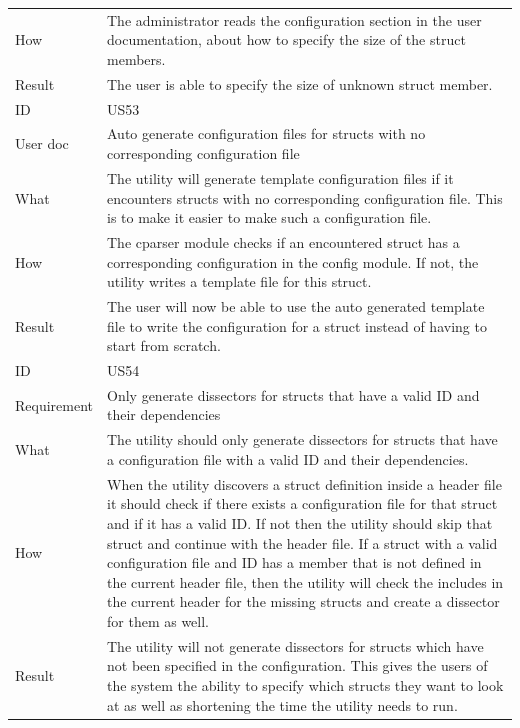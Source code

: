 \begin{table}[htbp]
{\begin{tabularx}{1.2\textwidth}{l X}
	How & The administrator reads the configuration section in the user documentation, about how to specify the size of the \gls{struct} \glspl{member}. \\
	Result & The user is able to specify the size of unknown \gls{struct} \gls{member}. \\	
	\midrule
	ID & US53 \\
	User doc & Auto generate configuration files for \glspl{struct} with no corresponding configuration file \\
	What & The \gls{utility} will generate template configuration files if it encounters \glspl{struct} with no corresponding configuration file. This is to make it easier to make such a configuration file.   \\
	How & The cparser module checks if an encountered \gls{struct} has a corresponding configuration in the config module. If not, the \gls{utility} writes a template file for this \gls{struct}.   \\
	Result & The user will now be able to use the auto generated template file to write the configuration for a \gls{struct} instead of having to start from scratch. \\
	\midrule
	ID & US54 \\
	Requirement & Only generate \glspl{dissector} for \glspl{struct} that have a valid ID and their dependencies \\
	What & The \gls{utility} should only generate \glspl{dissector} for \glspl{struct} that have a configuration file with a valid ID and their dependencies.    \\
	How & When the \gls{utility} discovers a \gls{struct} definition inside a \gls{header} file it should check if there exists a configuration file for that \gls{struct} and if it has a valid ID.
	If not then the \gls{utility} should skip that \gls{struct} and continue with the \gls{header} file. If a \gls{struct} with a valid configuration file and ID has a \gls{member} that is not defined in the current \gls{header}
	file, then the \gls{utility} will check the includes in the current \gls{header} for the missing \glspl{struct} and create a \gls{dissector} for them as well.\\
	Result & The \gls{utility} will not generate \glspl{dissector} for \glspl{struct} which have not been specified in the configuration.
	This gives the users of the system the ability to specify which \glspl{struct} they want to look at as well as shortening the time the \gls{utility} needs to run. \\
	\bottomrule
\end{tabularx}}
\end{table}

